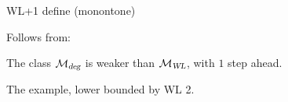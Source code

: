 %

%
%
%
%
%

WL+1 define  (monontone)




Follows from:

\begin{corollary}
The class $\mathcal{M}_{\textsl{deg}}$ is weaker than 
$\mathcal{M}_{\textsl{WL}}$, with $1$ step ahead.
\end{corollary}

\begin{example}
The example, lower bounded by WL 2.
\end{example}




